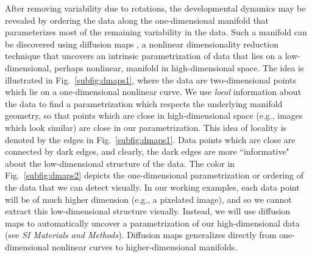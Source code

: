 \documentclass{pnastwo}
\newcommand{\SI}[0]{{\it SI Materials and Methods}}
\newcommand{\fig}[0]{Fig.}
\begin{document}
\begin{article}
After removing variability due to rotations, the developmental dynamics may be revealed by ordering the data along the one-dimensional manifold that parameterizes most of the remaining variability in the data.
%
Such a manifold can be discovered using diffusion maps \cite{coifman2005geometric}, a nonlinear dimensionality reduction technique that uncovers an intrinsic parametrization of data that lies on a low-dimensional, perhaps nonlinear, manifold in high-dimensional space.
%
The idea is illustrated in \fig~\ref{subfig:dmaps1}, where the data are two-dimensional points which lie on a one-dimensional nonlinear curve.
%
We use {\it local} information about the data to find a parametrization  which respects the underlying manifold geometry, so that points which are close in high-dimensional space (e.g., images which look similar) are close in our parametrization.
%
This idea of locality is denoted by the edges in \fig~\ref{subfig:dmaps1}.
%
Data points which are close are connected by dark edges, and clearly, the dark edges are more ``informative" about the low-dimensional structure of the data.
%
The color in \fig~\ref{subfig:dmaps2} depicts the one-dimensional parametrization or ordering of the data that we can detect visually.
%
In our working examples, each data point will be of much higher dimension (e.g., a pixelated image), and so we cannot extract this low-dimensional structure visually.
%
Instead, we will use diffusion maps to automatically uncover a parametrization of our high-dimensional data (see \SI).
%
Diffusion maps generalizes directly from one-dimensional nonlinear curves to higher-dimensional manifolds.



\end{article}
\end{document}
